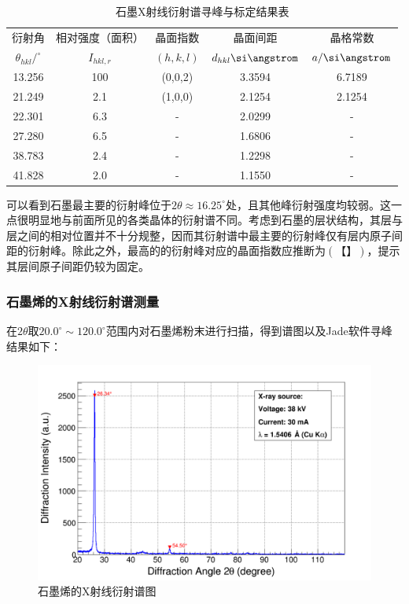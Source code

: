 \documentclass{thuemp}
\begin{document}
\begin{table}
    \centering
    \captionnamefont{\wuhao\bf\heiti}
    \captiontitlefont{\wuhao\bf\heiti}
    \caption{石墨X射线衍射谱寻峰与标定结果表}
    \label{tab:graphite_xrd}
    \liuhao
    \begin{tabular}{ccccc}
        \toprule
        衍射角 & 相对强度（面积）& 晶面指数 & 晶面间距 & 晶格常数 \\
        $\theta_{hkl}/^\circ$ & $I_{hkl,r}$ & $(h,k,l)$ & $d_{hkl}\text{\si\angstrom}$ & $a/\text{\si\angstrom}$\\
        \midrule
        13.256 & 100 & (0,0,2) & 3.3594 & 6.7189 \\
        21.249 & 2.1 & (1,0,0) & 2.1254 & 2.1254 \\
        22.301 & 6.3 &    -    & 2.0299 &   -    \\
        27.280 & 6.5 &    -    & 1.6806 &   -    \\
        38.783 & 2.4 &    -    & 1.2298 &   -    \\
        41.828 & 2.0 &    -    & 1.1550 &   -    \\
        \bottomrule
    \end{tabular}
\end{table}

可以看到石墨最主要的衍射峰位于$2\theta \approx 16.25^\circ$处，且其他峰衍射强度均较弱。这一点很明显地与前面所见的各类晶体的衍射谱不同。考虑到石墨的层状结构，其层与层之间的相对位置并不十分规整，因而其衍射谱中最主要的衍射峰仅有层内原子间距的衍射峰。除此之外，最高的的衍射峰对应的晶面指数应推断为$(【】)$，提示其层间原子间距仍较为固定。

\subsubsection{石墨烯的X射线衍射谱测量}

在$2\theta$取$20.0^\circ \sim 120.0^\circ$范围内对石墨烯粉末进行扫描，得到谱图以及Jade软件寻峰结果如下： 

\begin{figure}[H]
    \centering
    \includegraphics[width=0.8\linewidth]{../Data/C-Graphene-multi.png}
    \caption{石墨烯的X射线衍射谱图}
    \label{fig:graphene_xrd}
\end{figure}
\end{document}
